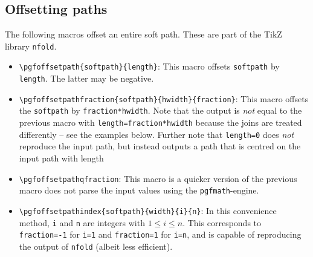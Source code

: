 \documentclass[12pt,a4paper]{article}
\theoremstyle{definition}
\newcommand{\nfold}{\texttt{nfold}}
\begin{document}
\subsection{Offsetting paths}
The following macros offset an entire soft path. These are part of the TikZ library \nfold.
\begin{itemize}
  \item \verb|\pgfoffsetpath{softpath}{length}|: This macro offsets \texttt{softpath} by \texttt{length}. The latter may be negative.
  \item \verb|\pgfoffsetpathfraction{softpath}{hwidth}{fraction}|: This macro offsets the \texttt{softpath} by \texttt{fraction*hwidth}. Note that the output is \emph{not} equal to the previous macro with \texttt{length=fraction*hwidth} because the joins are treated differently -- see the examples below. Further note that \texttt{length=0} does \emph{not} reproduce the input path, but instead outputs a path that is centred on the input path with length
  \item \verb|\pgfoffsetpathqfraction|: This macro is a quicker version of the previous macro  does not parse the input values using the \texttt{pgfmath}-engine.
  \item \verb|\pgfoffsetpathindex{softpath}{width}{i}{n}|: In this convenience method, \texttt{i} and \texttt{n} are integers with $1 \leq i \leq n$. This corresponds to \texttt{fraction=-1} for \texttt{i=1} and \texttt{fraction=1} for \texttt{i=n}, and is capable of reproducing the output of \nfold{} (albeit less efficient).
\end{itemize}

\begin{tkzexample}[latex=4cm]
\end{tkzexample}
\begin{tkzexample}[latex=4cm]
\end{tkzexample}
\end{document}
